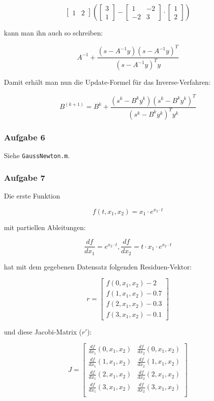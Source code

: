 \documentclass[a4paper, 12pt]{report}
\begin{document}
$$\begin{bmatrix}1 & 2\end{bmatrix}\left(\begin{bmatrix}3\\1\end{bmatrix} - \begin{bmatrix}1 & -2\\-2 & 3\end{bmatrix}\cdot\begin{bmatrix}1\\2\end{bmatrix}\right)$$

kann man ihn auch so schreiben:

$$ A^{-1} + \frac{ (s - A^{-1}y )(s - A^{-1}y)^T }{ (s - A^{-1}y)^Ty } $$

Damit erhält man nun die Update-Formel für das Inverse-Verfahren:

$$B^{(k+1)} = B^{k} + \frac{(s^k - B^ky^k)(s^k - B^ky^k)^T}{(s^k-B^ky^k)^Ty^k}$$

\subsubsection{Aufgabe 6}

Siehe \lstinline[basicstyle=\ttfamily\color{black}]|GaussNewton.m|.

\subsubsection{Aufgabe 7}

Die erste Funktion

$$f(t, x_1, x_2) = x_1\cdot e^{x_2\cdot t}$$

mit partiellen Ableitungen:

$$\frac{df}{dx_1} = e^{x_2\cdot t} , \frac{df}{dx_2} = t\cdot x_1 \cdot e^{x_2\cdot t} $$

hat mit dem gegebenen Datensatz folgenden Residuen-Vektor:

\def\arraystretch{1.25}
$$r = \begin{bmatrix} f(0, x_1, x_2) - 2 \\ f(1, x_1, x_2) - 0.7 \\ f(2, x_1, x_2) - 0.3 \\ f(3, x_1, x_2) - 0.1\end{bmatrix}$$

und diese Jacobi-Matrix ($r'$):

$$ J = \begin{bmatrix}
  \frac{df}{dx_1}(0, x_1, x_2) & \frac{df}{dx_2}(0, x_1, x_2)\\
  \frac{df}{dx_1}(1, x_1, x_2) & \frac{df}{dx_2}(1, x_1, x_2)\\
  \frac{df}{dx_1}(2, x_1, x_2) & \frac{df}{dx_2}(2, x_1, x_2)\\
  \frac{df}{dx_1}(3, x_1, x_2) & \frac{df}{dx_2}(3, x_1, x_2)\\
\end{bmatrix}$$
\end{document}
